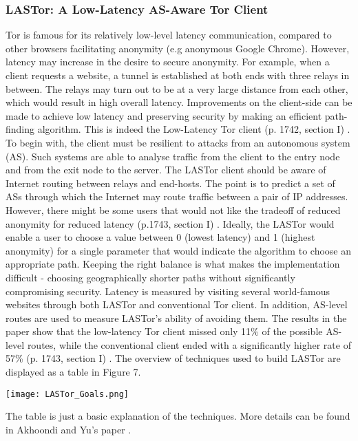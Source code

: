 \documentclass[a4paper, 12pt, titlepage]{article}
\begin{document}
\subsubsection{LASTor: A Low-Latency AS-Aware Tor Client}
Tor is famous for its relatively low-level latency communication, compared to other browsers facilitating anonymity (e.g anonymous Google Chrome). However, latency may increase in the desire to secure anonymity. For example, when a client requests a website, a tunnel is established at both ends with three relays in between. The relays may turn out to be at a very large distance from each other, which would result in high overall latency. Improvements on the client-side can be made to achieve low latency and preserving security by making an efficient path-finding algorithm. This is indeed the Low-Latency Tor client (p. 1742, section I) \cite{LASTor}. \\[6pt]
To begin with, the client must be resilient to attacks from an autonomous system (AS). Such systems are able to analyse traffic from the client to the entry node and from the exit node to the server. The LASTor client should be aware of Internet routing between relays and end-hosts. The point is to predict a set of ASs through which the Internet may route traffic between a pair of IP addresses. However, there might be some users that would not like the tradeoff of reduced anonymity for reduced latency (p.1743, section I) \cite{LASTor}. Ideally, the LASTor would enable a user to choose a value between 0 (lowest latency) and 1 (highest anonymity) for a single parameter that would indicate the algorithm to choose an appropriate path. Keeping the right balance is what makes the implementation difficult - choosing geographically shorter paths without significantly compromising security. Latency is measured by visiting several world-famous websites through both LASTor and conventional Tor client. In addition, AS-level routes are used to measure LASTor's ability of avoiding them. The results in the paper show that the low-latency Tor client missed only 11\% of the possible AS-level routes, while the conventional client ended with a significantly higher rate of 57\% (p. 1743, section I) \cite{LASTor}. The overview of techniques used to build LASTor are displayed as a table in Figure 7.

\begin{center}
\texttt{[image: LASTor\_Goals.png]}
\label{fig:Lastor}
\end{center}
The table is just a basic explanation of the techniques. More details can be found in Akhoondi and Yu's paper \cite{LASTor}.
\end{document}
